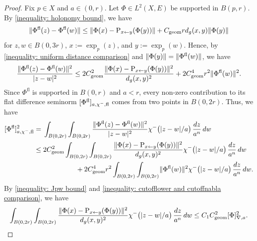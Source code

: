 \documentclass[a4paper,oneside,12pt]{amsart}
\theoremstyle{plain}
\theoremstyle{definition}
\theoremstyle{remark}
\DeclarePairedDelimiter{\abs}{\lvert}{\rvert}
\DeclarePairedDelimiter{\norm}{\lVert}{\rVert}
\DeclarePairedDelimiter{\seminorm}{\lbrack}{\rbrack}
\newcommand{\paralleltransport}[2]{\operatorname{P}_{#2 \gets #1}}
\newcommand{\mesoscopicdifferenceseminorm}[2][a]{\seminorm{#2}_{\nabla,#1}}
\newcommand{\flatmesoscopicdifferenceseminorm}[3][a]{\seminorm{#3}_{#1,#2,\mathrm{fl}}}
\newcommand{\cutofflower}{\chi^-}
\newcommand{\flatmodel}[1]{#1^{\mathrm{fl}}}
\newcommand{\constantgeometric}{C_{\mathrm{geom}}}
\begin{document}
\begin{proof}
  Fix $p \in X$ and $a \in (0,r)$.
  Let $\Phi \in L^2(X,E)$ be supported in $B(p,r)$.
  By \eqref{inequality: holonomy bound}, we have
  \begin{equation}
    \norm{\flatmodel{\Phi}(z) - \flatmodel{\Phi}(w)} \le \norm{\Phi(x)-\paralleltransport{y}{x}(\Phi(y))} + \constantgeometric r d_g(x,y) \norm{\Phi(y)}
  \end{equation}
  for $z,w \in B(0,3r)$, $x := \exp_p(z)$, and $y := \exp_p(w)$.
  Hence, by \eqref{inequality: uniform distance comparison} and $\norm{\Phi(y)} = \norm{\flatmodel{\Phi}(w)}$, we have
  \begin{equation}
    \frac{\norm{\flatmodel{\Phi}(z) - \flatmodel{\Phi}(w)}^2}{\abs{z-w}^2} \le 2 \constantgeometric^2 \frac{\norm{\Phi(x)-\paralleltransport{y}{x}(\Phi(y))}^2}{d_g(x,y)^2} + 2 \constantgeometric^4 r^2 \norm{\flatmodel{\Phi}(w)}^2.
  \end{equation}
  Since $\flatmodel{\Phi}$ is supported in $B(0,r)$ and $a < r$, every non-zero contribution to its flat difference seminorm $\flatmesoscopicdifferenceseminorm{\cutofflower}{\flatmodel{\Phi}}$ comes from two points in $B(0,2r)$.
  Thus, we have
  \begin{equation}
    \begin{aligned}
      \flatmesoscopicdifferenceseminorm{\cutofflower}{\flatmodel{\Phi}}^2 ={}& \int_{B(0,2r)} \int_{B(0,2r)}  \frac{\norm{\flatmodel{\Phi}(z)-\flatmodel{\Phi}(w)}^2}{\abs{z-w}^2} \cutofflower\bigl(\abs{z-w}/a\bigr) \,\frac{dz}{a^n} \,dw \\
      \le{}& \begin{multlined}[t]
        2 \constantgeometric^2  \int_{B(0,2r)} \int_{B(0,2r)} \frac{\norm{\Phi(x)-\paralleltransport{y}{x}(\Phi(y))}^2}{d_g(x,y)^2} \cutofflower\bigl(\abs{z-w}/a\bigr) \,\frac{dz}{a^n} \,dw \\
        + 2 \constantgeometric^4 r^2 \int_{B(0,2r)} \int_{B(0,2r)} \norm{\flatmodel{\Phi}(w)}^2 \cutofflower\bigl(\abs{z-w}/a\bigr) \,\frac{dz}{a^n} \,dw.
      \end{multlined}
    \end{aligned}
  \end{equation}
   By \eqref{inequality: Jpw bound} and \eqref{inequality: cutofflower and cutoffnabla comparison}, we have
  \begin{equation}
    \int_{B(0,2r)} \int_{B(0,2r)} \frac{\norm{\Phi(x)-\paralleltransport{y}{x}(\Phi(y))}^2}{d_g(x,y)^2} \cutofflower\bigl(\abs{z-w}/a\bigr) \,\frac{dz}{a^n} \,dw \le C_1 \constantgeometric^2 \mesoscopicdifferenceseminorm{\Phi}^2.

\end{equation}
\end{proof}
\end{document}
